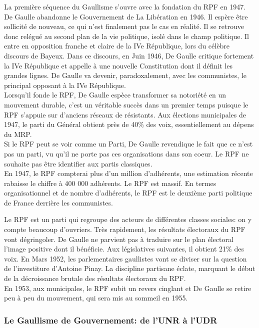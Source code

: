 \documentclass[10pt, a4paper, openany]{book}
\begin{document}
La première séquence du Gaullisme s'ouvre avec la fondation du RPF en 1947. De Gaulle abandonne le Gouvernement de La Libération en 1946. Il espère être sollicité de nouveau, ce qui n'est finalement pas le cas en réalité. Il se retrouve donc relégué au second plan de la vie politique, isolé dans le champ politique. Il entre en opposition franche et claire de la IVe République, lors du célèbre discours de Bayeux. Dans ce discours, en Juin 1946, De Gaulle critique fortement la IVe République et appelle à une nouvelle Constitution dont il définit les grandes lignes. De Gaulle va devenir, paradoxalement, avec les communistes, le principal opposant à la IVe République. \\
Lorsqu'il fonde le RPF, De Gaulle espèce transformer sa notoriété en un mouvement durable, c'est un véritable succès dans un premier temps puisque le RPF s'appuie sur d'anciens réseaux de résistants. Aux élections municipales de 1947, le parti du Général obtient près de 40\% des voix, essentiellement au dépens du MRP. \\
Si le RPF peut se voir comme un Parti, De Gaulle revendique le fait que ce n'est pas un parti, vu qu'il ne porte pas ces organisations dans son coeur. Le RPF ne souhaite pas être identifier aux partis classiques. \\
En 1947, le RPF compterai plus d'un million d'adhérents, une estimation récente rabaisse le chiffre à 400 000 adhérents. Le RPF est massif. En termes organisationnel et de nombre d'adhérents, le RPF est le deuxième parti politique de France derrière les communistes. 


Le RPF est un parti qui regroupe des acteurs de différentes classes sociales: on y compte beaucoup d'ouvriers. Très rapidement, les résultats électoraux du RPF vont dégringoler. De Gaulle ne parvient pas à traduire sur le plan électoral l'image positive dont il bénéficie. Aux législatives suivantes, il obtient 21\% des voix. En Mars 1952, les parlementaires gaullistes vont se diviser sur la question de l'investiture d'Antoine Pinay. La discipline partisane éclate, marquant le début de la décroissance brutale des résultats électoraux du RPF. \\
En 1953, aux municipales, le RPF subit un revers cinglant et De Gaulle se retire peu à peu du mouvement, qui sera mis au sommeil en 1955. 

\subsubsection{Le Gaullisme de Gouvernement: de l'UNR à l'UDR}
\end{document}
